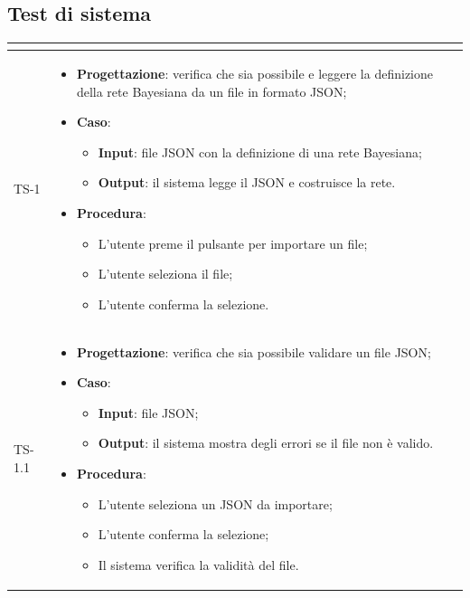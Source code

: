 \subsection{Test di sistema}
\normalsize
\renewcommand{\arraystretch}{1}
\begin{longtable}{|C{2.5cm}|C{13cm}|}
	\hline
	\textbf{\color{title_text}{Test}} & \textbf{\color{title_text}{Specifica}}  \\
	\hline
	\endhead
	{TS-1} &
\begin{itemize}
	\item \textbf{Progettazione}: verifica che sia possibile e leggere la
	definizione della rete Bayesiana da un file in formato JSON;
	\item \textbf{Caso}: 
	\begin{itemize}
		\item \textbf{Input}: file JSON con la definizione di una rete Bayesiana;
		\item \textbf{Output}: il sistema legge il JSON e costruisce la rete.
	\end{itemize}
	\item \textbf{Procedura}:
	\begin{itemize}
		\item L'utente preme il pulsante per importare un file;
		\item L'utente seleziona il file;
		\item L'utente conferma la selezione.
	\end{itemize} 
\end{itemize} \\
	\hline
	{TS-1.1} &
\begin{itemize}
	\item \textbf{Progettazione}: verifica che sia possibile validare un
	file JSON;
	\item \textbf{Caso}: 
	\begin{itemize}
		\item \textbf{Input}: file JSON;
		\item \textbf{Output}: il sistema mostra degli errori se il file non è valido.
	\end{itemize}
	\item \textbf{Procedura}:
	\begin{itemize}
		\item L'utente seleziona un JSON da importare;
		\item L'utente conferma la selezione;
		\item Il sistema verifica la validità del file.

\end{itemize}
\end{itemize}
\end{longtable}
